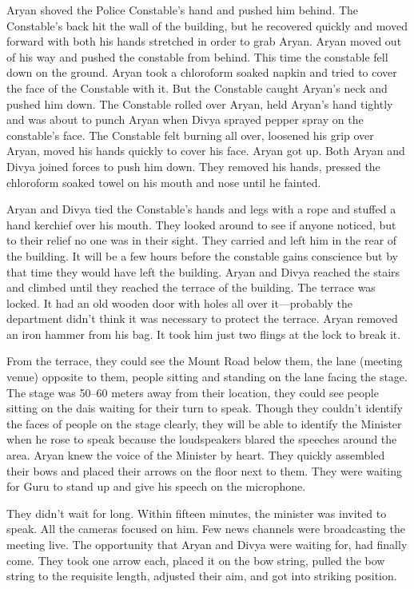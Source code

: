 Aryan shoved the Police Constable's hand and pushed him behind. The Constable's
back hit the wall of the building, but he recovered quickly and moved forward
with both his hands stretched in order to grab Aryan. Aryan moved out of his way
and pushed the constable from behind. This time the constable fell down on the
ground. Aryan took a chloroform soaked napkin and tried to cover the face of the
Constable with it. But the Constable caught Aryan's neck and pushed him down.
The Constable rolled over Aryan, held Aryan's hand tightly and was about to
punch Aryan when Divya sprayed pepper spray on the constable's face. The
Constable felt burning all over, loosened his grip over Aryan, moved his hands
quickly to cover his face. Aryan got up. Both Aryan and Divya joined forces to
push him down. They removed his hands, pressed the chloroform soaked towel on
his mouth and nose until he fainted.

Aryan and Divya tied the Constable's hands and legs with a rope and stuffed a
hand kerchief over his mouth. They looked around to see if anyone noticed, but
to their relief no one was in their sight. They carried and left him in the rear
of the building. It will be a few hours before the constable gains conscience
but by that time they would have left the building. Aryan and Divya reached the
stairs and climbed until they reached the terrace of the building. The terrace
was locked. It had an old wooden door with holes all over it—probably the
department didn't think it was necessary to protect the terrace. Aryan removed
an iron hammer from his bag. It took him just two flings at the lock to break
it.

From the terrace, they could see the Mount Road below them, the lane (meeting
venue) opposite to them, people sitting and standing on the lane facing the
stage. The stage was 50–60 meters away from their location, they could see
people sitting on the dais waiting for their turn to speak. Though they couldn't
identify the faces of people on the stage clearly, they will be able to identify
the Minister when he rose to speak because the loudspeakers blared the speeches
around the area. Aryan knew the voice of the Minister by heart. They quickly
assembled their bows and placed their arrows on the floor next to them. They
were waiting for Guru to stand up and give his speech on the microphone.

They didn't wait for long. Within fifteen minutes, the minister was invited to
speak. All the cameras focused on him. Few news channels were broadcasting the
meeting live. The opportunity that Aryan and Divya were waiting for, had finally
come. They took one arrow each, placed it on the bow string, pulled the bow
string to the requisite length, adjusted their aim, and got into striking
position.

